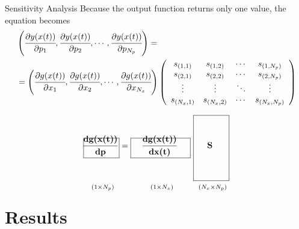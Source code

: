 \documentclass[8pt]{beamer}
\newcommand*{\claps}[1]{\hbox to 0pt{\hss#1\hss}}
\newcommand*{\mat}[1]{\boldsymbol{\mathrm{#1}}}
\newcommand*{\subdims}[3]{\clap{\raisebox{#1}[0pt][0pt]{$\scriptstyle(#2 \times #3)$}}}
\begin{document}
	\begin{frame}[fragile]{Sensitivity Analysis}
		Because the output function returns only one value, the equation becomes
		\footnotesize{\begin{align*}\begin{split}
				& \left( \cfrac{\partial y(x(t))}{\partial p_{1}}, \cfrac{\partial y(x(t))}{\partial p_{2}}, \cdots, \cfrac{\partial y(x(t))}{\partial p_{N_p}} \right) = \\
				& =\left( \cfrac{\partial g(x(t))}{\partial x_{1}}, \cfrac{\partial g(x(t))}{\partial x_{2}}, \cdots, \cfrac{\partial g(x(t))}{\partial x_{N_x}} \right)
				\left(\begin{array}{cccc}
					s_{({1,1})} & s_{({1,2})} & \cdots & s_{({1,N_p})}\\
					s_{({2,1})} & s_{({2,2})} & \cdots & s_{({2,N_p})}\\
					\vdots & \vdots & \ddots & \vdots\\
					s_{({N_x,1})} & s_{({N_x,2})} & \cdots & s_{({N_x,N_p})}
				\end{array}\right)
		\end{split}\end{align*}}
	
		\tiny{
		\[
		\framebox[1.5cm]{\claps{\raisebox{0pt}[0.3cm][0.3cm]{$\mat {\cfrac{d g(x(t))}{dp} } $}}		\subdims{-1.7cm} {1} {N_p}} =
		\framebox[2.5cm]{\claps{\raisebox{0pt}[0.3cm][0.3cm]{$\mat {\cfrac{d g(x(t))}{d x(t)} } $}} \subdims{-1.7cm} {1} {N_x}} \ 
		\framebox[1.5cm]{\claps{\raisebox{0pt}[1.25cm][1.25cm]{$\mat S$}}  							\subdims{-1.7cm} {N_x} {N_p}}
		\]}
	
	\end{frame}

	\section{Results}
	
\end{document}

